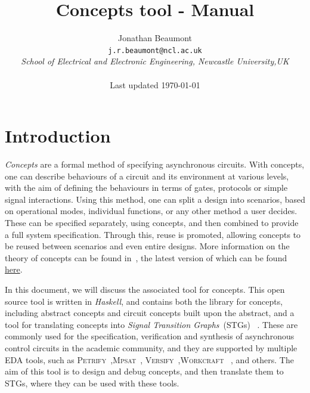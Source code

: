 \documentclass{proc}
\newcommand{\noun}[1]{\textsc{#1}}
\begin{document}
\title{Concepts tool - Manual}
\author{Jonathan Beaumont\\
\texttt{j.r.beaumont@ncl.ac.uk}\\
\emph{School of Electrical and Electronic Engineering, Newcastle University,UK}\\\\
Last updated \today}

\maketitle

\tableofcontents

\onecolumn

\section{Introduction}

\emph{Concepts} are a formal method of specifying asynchronous circuits. With concepts, one can describe behaviours of a circuit and its environment at various levels, with the aim of
defining the behaviours in terms of gates, protocols or simple signal interactions. Using this method, one can split a design into scenarios, based on operational modes, individual functions, or 
any other method a user decides. These can be specified separately, using concepts, and then combined to provide a full system specification. Through this, reuse is promoted,
 allowing concepts to be reused between scenarios and even entire designs. More information on the theory of concepts can be found in~\cite{2016_beaumont_concepts}, the latest version 
of which can be found \href{https://github.com/tuura/concepts-article/releases}{here}.

In this document, we will discuss the associated tool for concepts. This open source tool is written in \emph{Haskell}, and contains both the library for concepts, 
including abstract concepts and circuit concepts built upon the abstract, and a tool for translating concepts into \emph{Signal Transition Graphs}~(STGs)~\cite{Chu_1987_phd}
\cite{Rosenblum_1985_tpn}. These are commonly used for the specification, verification and synthesis of asynchronous control circuits in the academic community, and they are supported 
by multiple EDA tools, such as \noun{Petrify}~\cite{Cortadella},\noun{Mpsat}~\cite{khomenko2004detecting}, \noun{Versify}~\cite{i1997formal},\noun{Workcraft}~
\cite{2007_poliakov_workcraft}\cite{Workcraft_website}, and others.  The aim of this tool is to design and debug concepts, and then translate them to STGs, where they can be used with
 these tools. 
\end{document}
